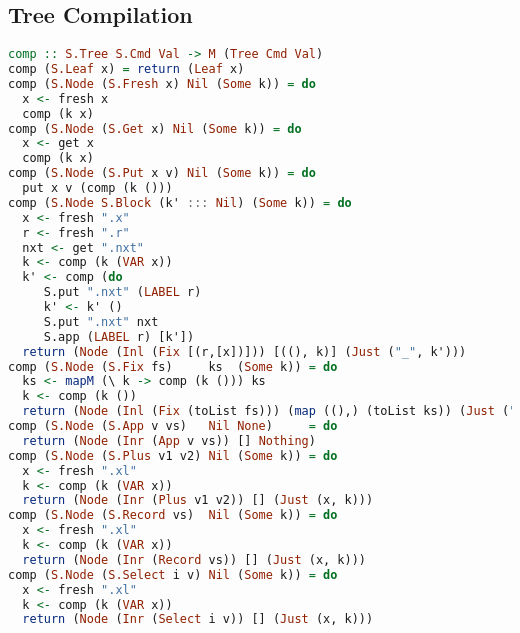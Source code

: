 \subsection{\label{subsection:semtosyn}Tree Compilation}
\begin{lstlisting}[language=Haskell]
comp :: S.Tree S.Cmd Val -> M (Tree Cmd Val)
comp (S.Leaf x) = return (Leaf x)
comp (S.Node (S.Fresh x) Nil (Some k)) = do
  x <- fresh x
  comp (k x)
comp (S.Node (S.Get x) Nil (Some k)) = do
  x <- get x
  comp (k x)
comp (S.Node (S.Put x v) Nil (Some k)) = do
  put x v (comp (k ()))
comp (S.Node S.Block (k' ::: Nil) (Some k)) = do
  x <- fresh ".x"
  r <- fresh ".r"
  nxt <- get ".nxt"
  k <- comp (k (VAR x))
  k' <- comp (do
     S.put ".nxt" (LABEL r)
     k' <- k' ()
     S.put ".nxt" nxt
     S.app (LABEL r) [k'])
  return (Node (Inl (Fix [(r,[x])])) [((), k)] (Just ("_", k')))
comp (S.Node (S.Fix fs)     ks  (Some k)) = do
  ks <- mapM (\ k -> comp (k ())) ks
  k <- comp (k ())
  return (Node (Inl (Fix (toList fs))) (map ((),) (toList ks)) (Just ("_", k)))
comp (S.Node (S.App v vs)   Nil None)     = do
  return (Node (Inr (App v vs)) [] Nothing)
comp (S.Node (S.Plus v1 v2) Nil (Some k)) = do
  x <- fresh ".xl"
  k <- comp (k (VAR x))
  return (Node (Inr (Plus v1 v2)) [] (Just (x, k)))
comp (S.Node (S.Record vs)  Nil (Some k)) = do
  x <- fresh ".xl"
  k <- comp (k (VAR x))
  return (Node (Inr (Record vs)) [] (Just (x, k)))
comp (S.Node (S.Select i v) Nil (Some k)) = do
  x <- fresh ".xl"
  k <- comp (k (VAR x))
  return (Node (Inr (Select i v)) [] (Just (x, k)))
\end{lstlisting}
